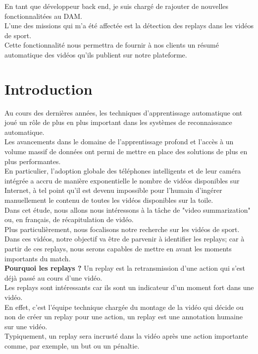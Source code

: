 \documentclass[11pt]{article}
\begin{document}
En tant que développeur back end, je suis chargé de rajouter de nouvelles fonctionnalitées au DAM.\\
L'une des missions qui m'a été affectée est la détection des replays dans les vidéos de sport.\\
Cette fonctionnalité nous permettra de fournir à nos clients un résumé automatique des vidéos qu'ils publient sur notre plateforme.\\

\newpage
\section{Introduction}
\label{sec:org3f2e6ce}
Au cours des dernières années, les techniques d'apprentissage automatique ont joué un rôle de plus en plus important dans les systèmes de reconnaissance automatique.\\
Les avancements dans le domaine de l'apprentissage profond et l'accès à un volume massif de données ont permi de mettre en place des solutions de plus en plus performantes.\\
En particulier, l'adoption globale des téléphones intelligents et de leur caméra intégrée a accru de manière exponentielle le nombre de vidéos disponibles sur Internet, à tel point qu'il est devenu impossible pour l'humain d'ingérer manuellement le contenu de toutes les vidéos disponibles sur la toile.\\
Dans cet étude, nous allons nous intéressons à la tâche de "video summarization" ou, en français, de récapitulation de vidéo.\\
Plus particulièrement, nous focalisons notre recherche sur les vidéos de sport.\\

Dans ces vidéos, notre objectif va être de parvenir à identifier les replays; car à partir de ces replays, nous serons capables de mettre en avant les moments importants du match.\\

\textbf{Pourquoi les replays ?} Un replay est la retransmission d'une action qui s'est déjà passé au cours d'une vidéo.\\
Les replays sont intéressants car ils sont un indicateur d'un moment fort dans une vidéo.\\
En effet, c'est l'équipe technique chargée du montage de la vidéo qui décide ou non de créer un replay pour une action, un replay est une annotation humaine sur une vidéo.\\
Typiquement, un replay sera incrusté dans la vidéo après une action importante comme, par exemple, un but ou un pénaltie.\\
\end{document}
